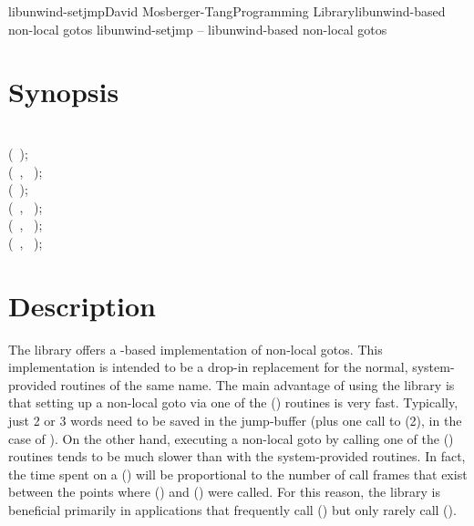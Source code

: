\documentclass{article}
\begin{document}
\begin{Name}{3}{libunwind-setjmp}{David Mosberger-Tang}{Programming Library}{libunwind-based non-local gotos}
  libunwind-setjmp -- libunwind-based non-local gotos
\end{Name}

\section{Synopsis}

\\

\noindent
{} (~);\\
 (~, ~);\\
 (~);\\
 (~, ~);\\
 (~, ~);\\
 (~, ~);\\

\section{Description}

The  library offers a -based
implementation of non-local gotos.  This implementation is intended to
be a drop-in replacement for the normal, system-provided routines of
the same name.  The main advantage of using the 
library is that setting up a non-local goto via one of the
() routines is very fast.  Typically, just 2 or 3 words
need to be saved in the jump-buffer (plus one call to
(2), in the case of ).  On the
other hand, executing a non-local goto by calling one of the
() routines tends to be much slower than with the
system-provided routines.  In fact, the time spent on a
() will be proportional to the number of call frames
that exist between the points where () and
() were called.  For this reason, the
 library is beneficial primarily in applications
that frequently call () but only rarely call
().
\end{document}
